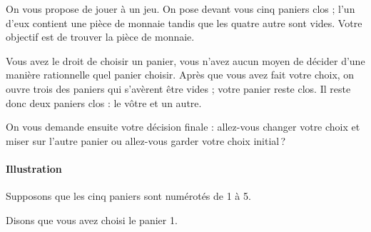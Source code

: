             \begin{exe}
                  On vous propose de jouer \`a un jeu.
                  On pose devant vous cinq paniers clos ; 
                  l'un d'eux contient une pi\`ece de monnaie tandis que
                  les quatre autre sont vides.
                  Votre objectif est de trouver la pi\`ece de monnaie.
                  
                  Vous avez le droit de choisir un panier, 
                  vous n'avez aucun moyen de d\'ecider d'une mani\`ere rationnelle quel panier choisir.
                  Apr\`es que vous avez fait votre choix, on ouvre trois des paniers qui s'av\`erent \^etre vides ;
                  votre panier reste clos.
                  Il reste donc deux paniers clos : le v\^otre et un autre.
                  
                  On vous demande ensuite votre d\'ecision finale : 
                        allez-vous changer votre choix et miser sur l'autre panier ou
                        allez-vous garder votre choix initial\,?
                        
                        \paragraph{Illustration}
                              Supposons que les cinq paniers sont num\'erot\'es de 1 \`a 5.
                              
                                    
                              Disons que vous avez choisi le panier 1.
                              
                                    

\end{exe}
